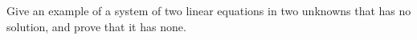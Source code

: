 Give an example of a system of two linear equations in two unknowns that has no solution, and prove that it has none.
